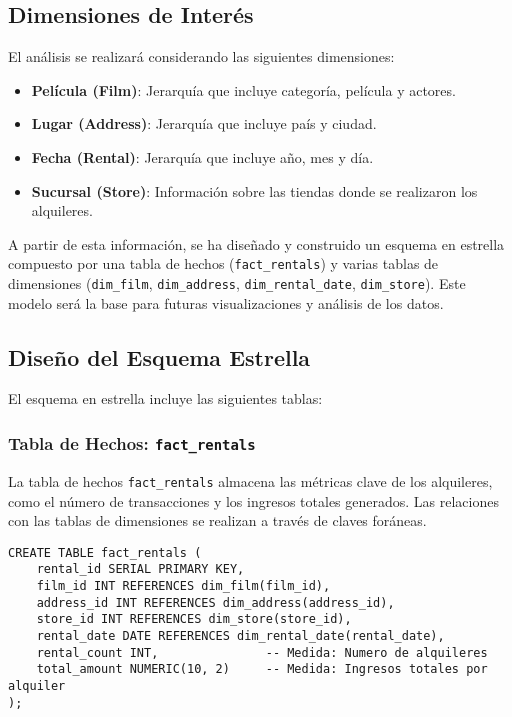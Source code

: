 \documentclass{article}
\begin{document}
\subsection{Dimensiones de Interés}

El análisis se realizará considerando las siguientes dimensiones:
\begin{itemize}
    \item \textbf{Película (Film)}: Jerarquía que incluye categoría, película y actores.
    \item \textbf{Lugar (Address)}: Jerarquía que incluye país y ciudad.
    \item \textbf{Fecha (Rental)}: Jerarquía que incluye año, mes y día.
    \item \textbf{Sucursal (Store)}: Información sobre las tiendas donde se realizaron los alquileres.
\end{itemize}

A partir de esta información, se ha diseñado y construido un esquema en estrella compuesto por una tabla de hechos (\texttt{fact\_rentals}) y varias tablas de dimensiones (\texttt{dim\_film}, \texttt{dim\_address}, \texttt{dim\_rental\_date}, \texttt{dim\_store}). Este modelo será la base para futuras visualizaciones y análisis de los datos.

\newpage
\subsection{Diseño del Esquema Estrella}

El esquema en estrella incluye las siguientes tablas:

\subsubsection{Tabla de Hechos: \texttt{fact\_rentals}}

La tabla de hechos \texttt{fact\_rentals} almacena las métricas clave de los alquileres, como el número de transacciones y los ingresos totales generados. Las relaciones con las tablas de dimensiones se realizan a través de claves foráneas.

\begin{lstlisting}
CREATE TABLE fact_rentals (
    rental_id SERIAL PRIMARY KEY,
    film_id INT REFERENCES dim_film(film_id),
    address_id INT REFERENCES dim_address(address_id),
    store_id INT REFERENCES dim_store(store_id),
    rental_date DATE REFERENCES dim_rental_date(rental_date),
    rental_count INT,               -- Medida: Numero de alquileres
    total_amount NUMERIC(10, 2)     -- Medida: Ingresos totales por alquiler
);
\end{lstlisting}
\end{document}
